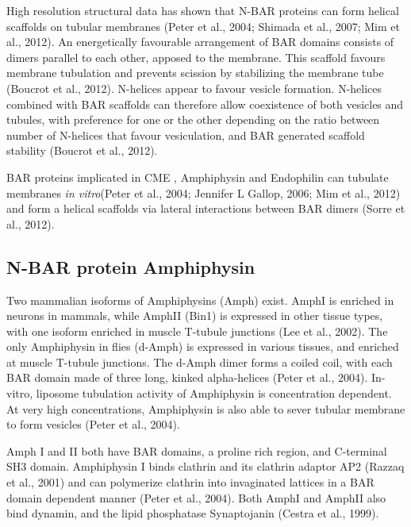 	\vspace{5mm}
High resolution structural data has shown that N-BAR proteins can form helical scaffolds on tubular membranes (Peter et al., 2004; Shimada et al., 2007; Mim et al., 2012). An energetically favourable arrangement of BAR domains consists of dimers parallel to each other, apposed to the membrane. This scaffold favours membrane tubulation and prevents scission by stabilizing the membrane tube (Boucrot et al., 2012). N-helices appear to favour vesicle formation. N-helices combined with BAR scaffolds can therefore allow coexistence of both vesicles and tubules, with preference for one or the other depending on the ratio between number of N-helices that favour vesiculation, and BAR generated scaffold stability (Boucrot et al., 2012). 



	\vspace{5mm}
BAR proteins implicated in CME , Amphiphysin and Endophilin can tubulate membranes \textit{in vitro}(Peter et al., 2004; Jennifer L Gallop, 2006; Mim et al., 2012) and form a helical scaffolds via lateral interactions between BAR dimers (Sorre et al., 2012). 



	\subsection{N-BAR protein Amphiphysin }		
Two mammalian isoforms of Amphiphysins (Amph) exist. AmphI is enriched in neurons in mammals, while AmphII (Bin1) is expressed in other tissue types, with one isoform enriched in muscle T-tubule junctions (Lee et al., 2002). The only Amphiphysin in flies (d-Amph) is expressed in various tissues, and enriched at muscle T-tubule junctions. The d-Amph dimer forms a coiled coil, with each BAR domain made of three long, kinked alpha-helices (Peter et al., 2004). In-vitro, liposome tubulation activity of Amphiphysin is concentration dependent. At very high concentrations, Amphiphysin is also able to sever tubular membrane to form vesicles (Peter et al., 2004). 

	\vspace{5mm}
Amph I and II both have BAR domains, a proline rich region, and C-terminal SH3 domain.
Amphiphysin I binds clathrin and its clathrin adaptor AP2 (Razzaq et al., 2001) and can polymerize clathrin into invaginated lattices in a BAR domain dependent manner (Peter et al., 2004). Both AmphI and AmphII also bind dynamin, and the lipid phosphatase Synaptojanin (Cestra et al., 1999).




